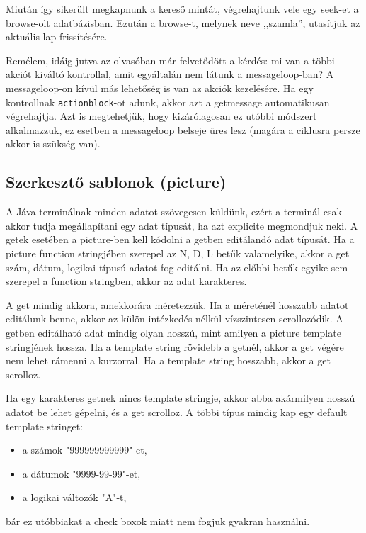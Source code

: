Miután így sikerült megkapnunk a kereső mintát, 
végrehajtunk vele egy seek-et a browse-olt adatbázisban. 
Ezután a browse-t, melynek neve ,,szamla'', utasítjuk az 
aktuális lap frissítésére.


Remélem, idáig jutva az olvasóban már felvetődött a kérdés: 
mi van a többi akciót kiváltó kontrollal, amit egyáltalán 
nem  látunk a messageloop-ban? 
A messageloop-on kívül más lehetőség is van az akciók kezelésére.
Ha egy kontrollnak \verb!actionblock!-ot adunk, akkor azt a
getmessage automatikusan végrehajtja. Azt is megtehetjük, hogy
kizárólagosan ez utóbbi módszert alkalmazzuk, ez esetben
a messageloop belseje üres lesz (magára a ciklusra persze
akkor is szükség van).



 

\subsection{Szerkesztő sablonok (picture)}
 
A Jáva terminálnak minden adatot szövegesen küldünk, 
ezért a terminál csak akkor tudja megállapítani egy adat típusát, 
ha azt explicite megmondjuk neki.
A getek esetében a picture-ben kell kódolni a getben editálandó
adat típusát. Ha a picture function stringjében szerepel
az N, D, L betűk valamelyike, akkor a get szám, dátum, logikai
típusú adatot fog editálni. Ha az előbbi betűk egyike sem
szerepel a function stringben, akkor az adat karakteres.

A get mindig akkora, amekkorára méretezzük. Ha a méreténél
hosszabb adatot editálunk benne, akkor az külön intézkedés 
nélkül vízszintesen scrollozódik.
A getben editálható adat mindig olyan hosszú, mint amilyen
a picture template stringjének hossza. Ha a template string
rövidebb a getnél, akkor a get végére nem lehet rámenni
a kurzorral. Ha a template string hosszabb, akkor a get scrolloz.

Ha egy karakteres getnek nincs template stringje, akkor abba
akármilyen hosszú adatot be lehet gépelni, és a get scrolloz.
A többi típus mindig kap egy default template stringet:
\begin{itemize}
\item a számok "999999999999"-et,
\item a dátumok "9999-99-99"-et,
\item a logikai változók {"}A"-t, 
\end{itemize}
bár ez utóbbiakat a check boxok miatt nem fogjuk gyakran használni.

